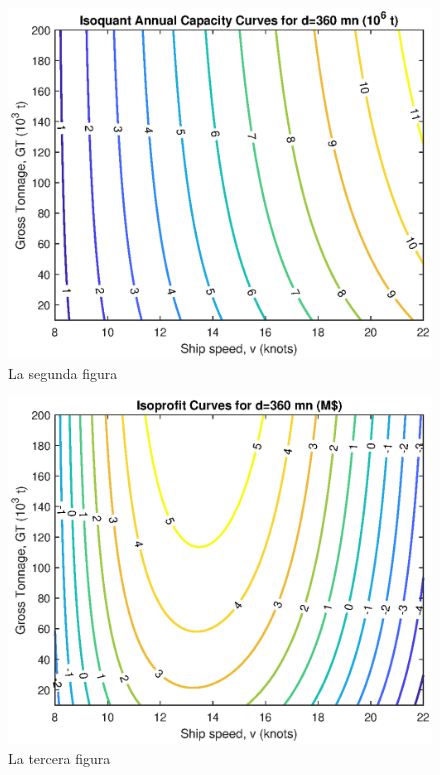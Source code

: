 	\begin{minipage}{0.5\textwidth}	
		\begin{figure}[H] 
		\includegraphics[width=1.00 \textwidth]{images/minipage1.eps}
		\caption{La segunda figura}
		\label{fig: minip}
		\end{figure}	
\end{minipage} \hfill \begin{minipage}{0.5\textwidth}	  
	\begin{figure}[H] 
		\includegraphics[width=1.00 \textwidth]{images/minipage2.eps}
		\caption{La tercera figura}
		\label{fig: minip2}
	\end{figure}
\end{minipage}


